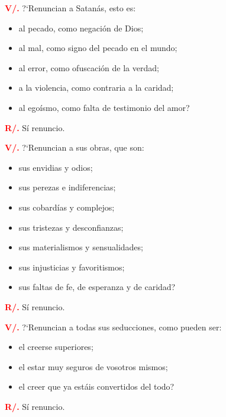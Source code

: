 \documentclass[12pt, letterpaper]{report}
\begin{document}
\noindent
\Large {\bfseries \textcolor{red}{V/.}} \hspace{0.5cm} ?`Renuncian a Satan\'as, esto es:
\begin{itemize}[leftmargin=2.0cm,labelsep=0.5cm]
\item al pecado, como negaci\'on de Dios;
\item al mal, como signo del pecado en el mundo;
\item al error, como ofuscaci\'on de la verdad;
\item a la violencia, como contraria a la caridad;
\item al ego\'ismo, como falta de testimonio del amor?
\end{itemize}
\Large {\bfseries \textcolor{red}{R/.}} \hspace{0.5cm} S\'i renuncio. \newline

\noindent
\Large {\bfseries \textcolor{red}{V/.}} \hspace{0.5cm} ?`Renuncian a sus obras, que son:
\begin{itemize}[leftmargin=2.0cm,labelsep=0.5cm]
\item sus envidias y odios;
\item sus perezas e indiferencias;
\item sus cobard\'ias y complejos;
\item sus tristezas y desconfianzas;
\item sus materialismos y sensualidades;
\item sus injusticias y favoritismos;
\item sus faltas de fe, de esperanza y de caridad?
\end{itemize}
\Large {\bfseries \textcolor{red}{R/.}} \hspace{0.5cm} S\'i renuncio. \newline

\newpage

\noindent
\Large {\bfseries \textcolor{red}{V/.}} \hspace{0.5cm} ?`Renuncian a todas sus seducciones, como pueden ser:
\begin{itemize}[leftmargin=2.0cm,labelsep=0.5cm]
\item el creerse superiores;
\item el estar muy seguros de vosotros mismos;
\item el creer que ya est\'ais convertidos del todo?
\end{itemize}
\Large {\bfseries \textcolor{red}{R/.}} \hspace{0.5cm} S\'i renuncio. \newline
\end{document}
